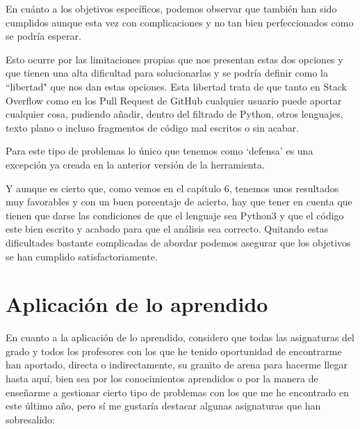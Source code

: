 \documentclass[a4paper, 12pt]{book}
\begin{document}
En cuánto a los objetivos específicos, podemos observar que también han sido cumplidos aunque esta vez con complicaciones y no tan bien perfeccionados como se podría esperar.

Esto ocurre por las limitaciones propias que nos presentan estas dos opciones y que tienen una alta dificultad para solucionarlas y se podría definir como la ``libertad" que nos dan estas opciones. Esta libertad trata de que tanto en Stack Overflow como en los Pull Request de GitHub cualquier usuario puede aportar cualquier cosa, pudiendo añadir, dentro del filtrado de Python, otros lenguajes, texto plano o incluso fragmentos de código mal escritos o sin acabar.

Para este tipo de problemas lo único que tenemos como `defensa' es una excepción ya creada en la anterior versión de la herramienta.

Y aunque es cierto que, como vemos en el capítulo 6, tenemos unos resultados muy favorables y con un buen porcentaje de acierto, hay que tener en cuenta que tienen que darse las condiciones de que el lenguaje sea Python3 y que el código este bien escrito y acabado para que el análisis sea correcto. Quitando estas dificultades bastante complicadas de abordar podemos asegurar que los objetivos se han cumplido satisfactoriamente.

\section{Aplicación de lo aprendido}
\label{sec:aplicacion}

En cuanto a la aplicación de lo aprendido, considero que todas las asignaturas del grado y todos los profesores con los que he tenido oportunidad de encontrarme han aportado, directa o indirectamente, su granito de arena para hacerme llegar hasta aquí, bien sea por los conocimientos aprendidos o por la manera de enseñarme a gestionar cierto tipo de problemas con los que me he encontrado en este último año, pero sí me gustaría destacar algunas asignaturas que han sobresalido:
\end{document}
